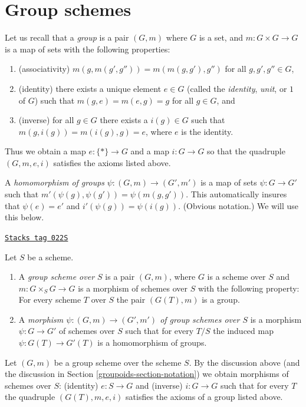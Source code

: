 \section{Group schemes}
\label{groupoids-section-group-schemes}
Let us recall that a {\it group} is a pair
$(G, m)$ where $G$ is a set, and $m : G \times G \to G$ is
a map of sets with the following properties:
\begin{enumerate}
\item (associativity) $m(g, m(g', g'')) = m(m(g, g'), g'')$
for all $g, g', g'' \in G$,
\item (identity) there exists a unique element $e \in G$
(called the {\it identity}, {\it unit}, or $1$ of $G$) such that
$m(g, e) = m(e, g) = g$ for all $g \in G$, and
\item (inverse) for all $g \in G$ there exists a $i(g) \in G$
such that $m(g, i(g)) = m(i(g), g) = e$, where $e$ is the
identity.
\end{enumerate}
Thus we obtain a map $e : \{*\} \to G$ and a map
$i : G \to G$ so that the quadruple $(G, m, e, i)$
satisfies the axioms listed above.

\medskip\noindent
A {\it homomorphism of groups} $\psi : (G, m) \to (G', m')$
is a map of sets $\psi : G \to G'$ such that
$m'(\psi(g), \psi(g')) = \psi(m(g, g'))$. This automatically
insures that $\psi(e) = e'$ and $i'(\psi(g)) = \psi(i(g))$.
(Obvious notation.) We will use this below.

\begin{definition}
\label{groupoids-definition-group-scheme}
\href{https://stacks.math.columbia.edu/tag/022S}{\texttt{Stacks tag 022S}}

Let $S$ be a scheme.
\begin{enumerate}
\item A {\it group scheme over $S$} is a pair $(G, m)$, where
$G$ is a scheme over $S$ and $m : G \times_S G \to G$ is
a morphism of schemes over $S$ with the following property:
For every scheme $T$ over $S$ the pair $(G(T), m)$
is a group.
\item A {\it morphism $\psi : (G, m) \to (G', m')$ of group schemes over $S$}
is a morphism $\psi : G \to G'$ of schemes over $S$ such that for
every $T/S$ the induced map $\psi : G(T) \to G'(T)$ is a homomorphism
of groups.
\end{enumerate}
\end{definition}

Let $(G, m)$ be a group scheme over the scheme $S$.
By the discussion above (and the discussion in Section \ref{groupoids-section-notation})
we obtain morphisms of schemes over $S$:
(identity) $e : S \to G$ and (inverse) $i : G \to G$ such that
for every $T$ the quadruple $(G(T), m, e, i)$ satisfies the
axioms of a group listed above.

